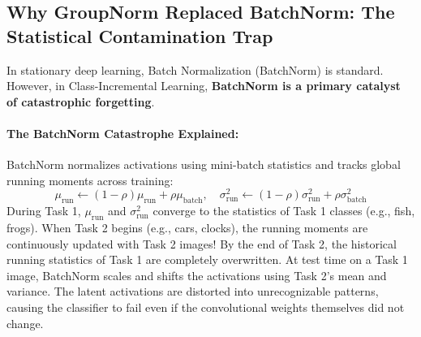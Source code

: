 \documentclass[11pt,a4paper]{article}
\begin{document}
\subsection{Why GroupNorm Replaced BatchNorm: The Statistical Contamination Trap}
In stationary deep learning, Batch Normalization (BatchNorm) is standard. However, in Class-Incremental Learning, \textbf{BatchNorm is a primary catalyst of catastrophic forgetting}.

\paragraph{The BatchNorm Catastrophe Explained:}
BatchNorm normalizes activations using mini-batch statistics and tracks global running moments across training:
\begin{equation}
\mu_{\text{run}} \leftarrow (1 - \rho)\mu_{\text{run}} + \rho \mu_{\text{batch}}, \quad \sigma^2_{\text{run}} \leftarrow (1 - \rho)\sigma^2_{\text{run}} + \rho \sigma^2_{\text{batch}}
\end{equation}
During Task 1, $\mu_{\text{run}}$ and $\sigma^2_{\text{run}}$ converge to the statistics of Task 1 classes (e.g., fish, frogs). When Task 2 begins (e.g., cars, clocks), the running moments are continuously updated with Task 2 images! By the end of Task 2, the historical running statistics of Task 1 are completely overwritten. At test time on a Task 1 image, BatchNorm scales and shifts the activations using Task 2's mean and variance. The latent activations are distorted into unrecognizable patterns, causing the classifier to fail even if the convolutional weights themselves did not change.
\end{document}
